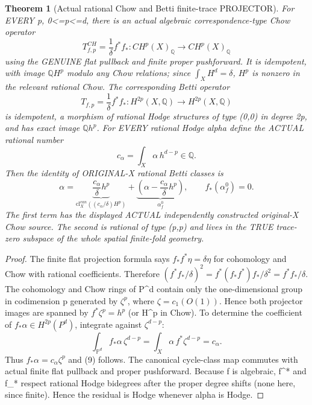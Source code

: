 \documentclass[11pt]{article}
\newtheorem{theorem}{Theorem}
\begin{document}
\begin{theorem}[Actual rational Chow and Betti finite-trace PROJECTOR]
For EVERY p, 0<=p<=d,
there is an actual algebraic
correspondence-type Chow operator
\[
 \boxed{
 T^{CH}_{f,p}=
 \frac1\delta f^*f_*:
 CH^p(X)_\mathbb Q\to CH^p(X)_\mathbb Q
 }                                                       \tag{7}
\]
using the GENUINE flat pullback
and finite proper pushforward.
It is idempotent, with image
$\mathbb Q H^p$ modulo any
Chow relations; since $\int_XH^d
=\delta$, $H^p$ is nonzero
in the relevant rational Chow.
The corresponding Betti operator
\[
 \boxed{
 T_{f,p}=\frac1\delta f^*f_*:
 H^{2p}(X,\mathbb Q)\to H^{2p}(X,\mathbb Q)
 }                                                       \tag{8}
\]
is idempotent, a morphism of
rational Hodge structures
of type (0,0) in degree 2p,
and has exact image $\mathbb Q h^p$.
For EVERY rational Hodge alpha
define the ACTUAL rational
number
\[
 c_\alpha=\int_X\alpha\,h^{d-p}\in\mathbb Q.
\]
Then the identity of ORIGINAL-X
rational Betti classes is
\[
 \boxed{
 \alpha=\underbrace{\frac{c_\alpha}
  {\delta}h^p}_{\mathrm{cl}_X^{can}
  ((c_\alpha/\delta)H^p)}
 +\underbrace{\left(
   \alpha-\frac{c_\alpha}{\delta}h^p
             \right)}_{\alpha_f^0},
 \qquad
 f_*(\alpha_f^0)=0 .
 }                                                       \tag{9}
\]
The first term has the displayed
ACTUAL independently constructed
original-X Chow source. The
second is rational of type (p,p)
and lives in the TRUE trace-zero
subspace of the whole spatial
finite-fold geometry.
\end{theorem}
\begin{proof}
The finite flat projection
formula says
$f_*f^*\eta=\delta\eta$
for cohomology and Chow
with rational coefficients.
Therefore
$(f^*f_*/\delta)^2
=f^*(f_*f^*)f_*/\delta^2
=f^*f_*/\delta$.
The cohomology and Chow rings
of P^d contain only the
one-dimensional group
in codimension p generated by
$\zeta^p$,
where $\zeta=c_1(O(1))$.
Hence both projector images
are spanned by $f^*\zeta^p=h^p$
(or H^p in Chow).
To determine the coefficient
of $f_*\alpha\in H^{2p}(P^d)$,
integrate against $\zeta^{d-p}$:
\[
 \int_{\mathbb P^d}
 f_*\alpha\,\zeta^{d-p}
 =\int_X\alpha\,f^*\zeta^{d-p}
 =c_\alpha .
\]
Thus $f_*\alpha=c_\alpha\zeta^p$
and (9) follows. The canonical
cycle-class map commutes with
actual finite flat pullback
and proper pushforward.
Because f is algebraic, f^* and
f_* respect rational Hodge
bidegrees after the proper
degree shifts (none here, since
finite). Hence the residual is
Hodge whenever alpha is Hodge.
\end{proof}
\end{document}
